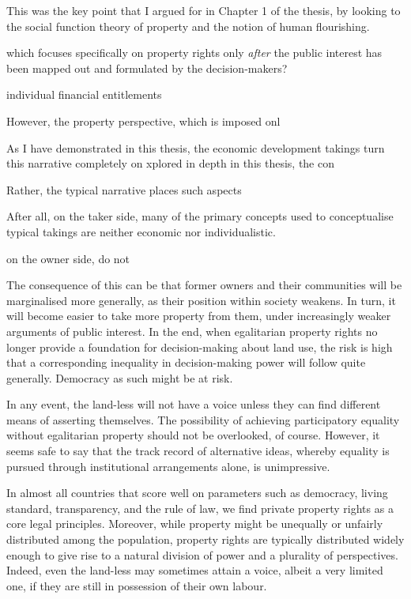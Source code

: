{ This was the key point that I argued for in Chapter 1 of the thesis, by looking to the social function theory of property and the notion of human flourishing. 


which focuses specifically on property rights only {\it after} the public interest has been mapped out and formulated by the decision-makers? 



 individual financial entitlements 

However, the property perspective, which is imposed onl

As I have demonstrated in this thesis, the economic development takings turn this narrative completely on  xplored in depth in this thesis, the con

Rather, the typical narrative places such aspects

After all, on the taker side, many of the primary concepts used to conceptualise typical takings are neither economic nor individualistic.

 on the owner side, do not 

The consequence of this can be that former owners and their communities will be marginalised more generally, as their position within society weakens. In turn, it will become easier to take more property from them, under increasingly weaker arguments of public interest. In the end, when egalitarian property rights no longer provide a foundation for decision-making about land use, the risk is high that a corresponding inequality in decision-making power will follow quite generally. Democracy as such might be at risk.

In any event, the land-less will not have a voice unless they can find different means of asserting themselves. The possibility of achieving participatory equality without egalitarian property should not be overlooked, of course. However, it seems safe to say that the track record of alternative ideas, whereby equality is pursued through institutional arrangements alone, is unimpressive. 

In almost all countries that score well on parameters such as democracy, living standard, transparency, and the rule of law, we find private property rights as a core legal principles. Moreover, while property might be unequally or unfairly distributed among the population, property rights are typically distributed widely enough to give rise to a natural division of power and a plurality of perspectives. Indeed, even the land-less may sometimes attain a voice, albeit a very limited one, if they are still in possession of their own labour.

}

